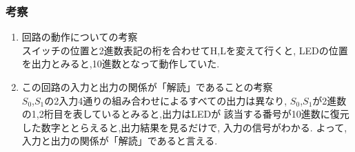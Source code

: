 \documentclass[twocolumn, 10pt,a4j]{jsarticle}
\begin{document}
  \subsubsection{考察}
  \begin{enumerate}
    \item 回路の動作についての考察 \\
      スイッチの位置と2進数表記の桁を合わせてH,Lを変えて行くと,
      LEDの位置を出力とみると,10進数となって動作していた.
    \item この回路の入力と出力の関係が「解読」であることの考察 \\
      $S_{0}$,$S_{1}$の2入力4通りの組み合わせによるすべての出力は異なり,
      $S_{0}$,$S_{1}$が2進数の1,2桁目を表しているとみると,出力はLEDが
      該当する番号が10進数に復元した数字ととらえると,出力結果を見るだけで,
      入力の信号がわかる.
      よって,入力と出力の関係が「解読」であると言える.
  \end{enumerate}
\end{document}
